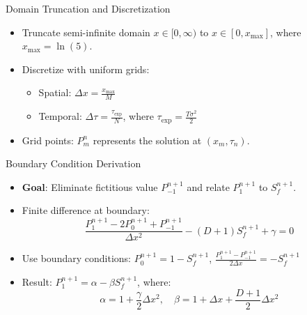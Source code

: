 \documentclass{beamer}
\begin{document}
\begin{frame}{Domain Truncation and Discretization}
    \begin{itemize}
        \item Truncate semi-infinite domain \( x \in [0, \infty) \) to \( x \in [0, x_{\max}] \), where \( x_{\max} = \ln(5) \).
        \item Discretize with uniform grids:
        \begin{itemize}
            \item Spatial: \( \Delta x = \frac{x_{\max}}{M} \)
            \item Temporal: \( \Delta \tau = \frac{\tau_{\exp}}{N} \), where \( \tau_{\exp} = \frac{T \sigma^2}{2} \)
        \end{itemize}
        \item Grid points: \( P_m^n \) represents the solution at \( (x_m, \tau_n) \).
    \end{itemize}
\end{frame}

\begin{frame}{Boundary Condition Derivation}
    \begin{itemize}
        \item \textbf{Goal}: Eliminate fictitious value \( P_{-1}^{n+1} \) and relate \( P_1^{n+1} \) to \( S_f^{n+1} \).
        \item Finite difference at boundary:
        \[
        \frac{P_1^{n+1} - 2 P_0^{n+1} + P_{-1}^{n+1}}{\Delta x^2} - (D + 1) S_f^{n+1} + \gamma = 0
        \]
        \item Use boundary conditions: \( P_0^{n+1} = 1 - S_f^{n+1} \), \( \frac{P_1^{n+1} - P_{-1}^{n+1}}{2 \Delta x} = -S_f^{n+1} \)
        \item Result: \( P_1^{n+1} = \alpha - \beta S_f^{n+1} \), where:
        \[
        \alpha = 1 + \frac{\gamma}{2} \Delta x^2, \quad \beta = 1 + \Delta x + \frac{D + 1}{2} \Delta x^2
        \]
    \end{itemize}
\end{frame}
\end{document}
